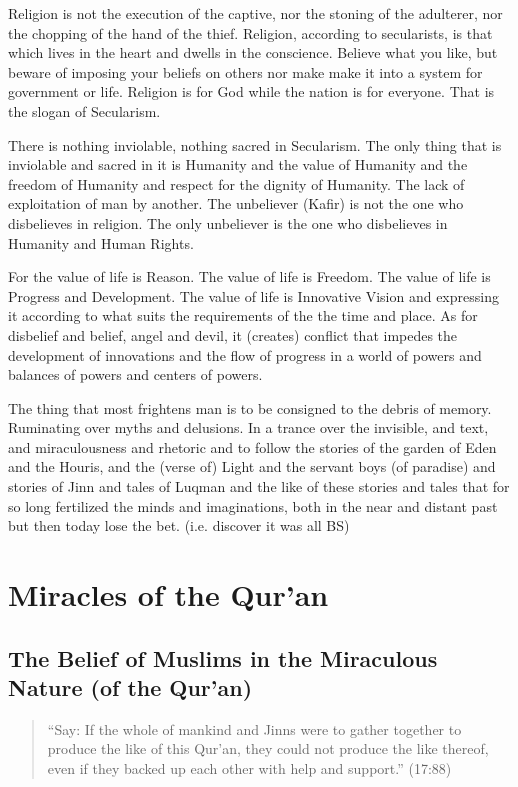 \documentclass[12pt]{book}
\begin{document}
Religion is not the execution of the captive, nor the stoning of the adulterer,
nor the chopping of the hand of the thief. Religion, according to secularists,
is that which lives in the heart and dwells in the conscience. Believe what you
like, but beware of imposing your beliefs on others nor make make it into a
system for government or life. Religion is for God while the nation is for
everyone. That is the slogan of Secularism.

There is nothing inviolable, nothing sacred in Secularism. The only thing that
is inviolable and sacred in it is Humanity and the value of Humanity and the
freedom of Humanity and respect for the dignity of Humanity. The lack of
exploitation of man by another. The unbeliever (Kafir) is not the one who
disbelieves in religion. The only unbeliever is the one who disbelieves in
Humanity and Human Rights.

For the value of life is Reason. The value of life is Freedom. The value of
life is Progress and Development. The value of life is Innovative Vision and
expressing it according to what suits the requirements of the the time and
place. As for disbelief and belief, angel and devil, it (creates) conflict that
impedes the development of innovations and the flow of progress in a world of
powers and balances of powers and centers of powers.

The thing that most frightens man is to be consigned to the debris of memory.
Ruminating over myths and delusions. In a trance over the invisible, and text,
and miraculousness and rhetoric and to follow the stories of the garden of Eden
and the Houris, and the (verse of) Light and the servant boys (of paradise) and
stories of Jinn and tales of Luqman and the like of these stories and tales
that for so long fertilized the minds and imaginations, both in the near and
distant past but then today lose the bet. (i.e. discover it was all BS)

\chapter{Miracles of the Qur’an}

\section{The Belief of Muslims in the Miraculous Nature (of the Qur’an)}

\begin{quote}
“Say: If the whole of mankind and Jinns were to gather together to produce the
like of this Qur’an, they could not produce the like thereof, even if they
backed up each other with help and support.” (17:88)
\end{quote}
\end{document}
